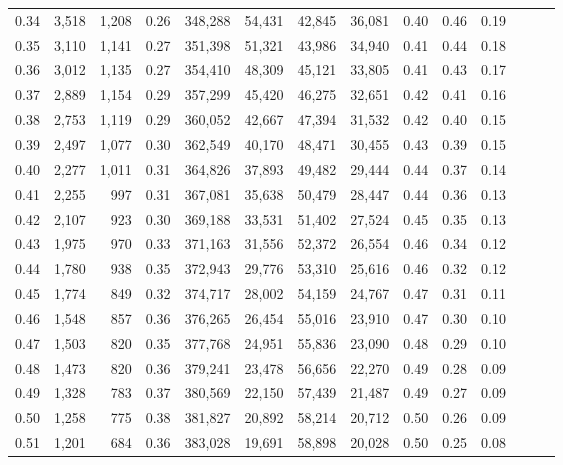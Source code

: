 \begin{tabular}{rrrrrrrrrrrrrr}
0.34 &   3,518 &  1,208 &  0.26 &  348,288 &   54,431 &  42,845 &  36,081 &  0.40 &  0.46 &      0.19 \\
0.35 &   3,110 &  1,141 &  0.27 &  351,398 &   51,321 &  43,986 &  34,940 &  0.41 &  0.44 &      0.18 \\
0.36 &   3,012 &  1,135 &  0.27 &  354,410 &   48,309 &  45,121 &  33,805 &  0.41 &  0.43 &      0.17 \\
0.37 &   2,889 &  1,154 &  0.29 &  357,299 &   45,420 &  46,275 &  32,651 &  0.42 &  0.41 &      0.16 \\
0.38 &   2,753 &  1,119 &  0.29 &  360,052 &   42,667 &  47,394 &  31,532 &  0.42 &  0.40 &      0.15 \\
0.39 &   2,497 &  1,077 &  0.30 &  362,549 &   40,170 &  48,471 &  30,455 &  0.43 &  0.39 &      0.15 \\
0.40 &   2,277 &  1,011 &  0.31 &  364,826 &   37,893 &  49,482 &  29,444 &  0.44 &  0.37 &      0.14 \\
0.41 &   2,255 &    997 &  0.31 &  367,081 &   35,638 &  50,479 &  28,447 &  0.44 &  0.36 &      0.13 \\
0.42 &   2,107 &    923 &  0.30 &  369,188 &   33,531 &  51,402 &  27,524 &  0.45 &  0.35 &      0.13 \\
0.43 &   1,975 &    970 &  0.33 &  371,163 &   31,556 &  52,372 &  26,554 &  0.46 &  0.34 &      0.12 \\
0.44 &   1,780 &    938 &  0.35 &  372,943 &   29,776 &  53,310 &  25,616 &  0.46 &  0.32 &      0.12 \\
0.45 &   1,774 &    849 &  0.32 &  374,717 &   28,002 &  54,159 &  24,767 &  0.47 &  0.31 &      0.11 \\
0.46 &   1,548 &    857 &  0.36 &  376,265 &   26,454 &  55,016 &  23,910 &  0.47 &  0.30 &      0.10 \\
0.47 &   1,503 &    820 &  0.35 &  377,768 &   24,951 &  55,836 &  23,090 &  0.48 &  0.29 &      0.10 \\
0.48 &   1,473 &    820 &  0.36 &  379,241 &   23,478 &  56,656 &  22,270 &  0.49 &  0.28 &      0.09 \\
0.49 &   1,328 &    783 &  0.37 &  380,569 &   22,150 &  57,439 &  21,487 &  0.49 &  0.27 &      0.09 \\
0.50 &   1,258 &    775 &  0.38 &  381,827 &   20,892 &  58,214 &  20,712 &  0.50 &  0.26 &      0.09 \\
0.51 &   1,201 &    684 &  0.36 &  383,028 &   19,691 &  58,898 &  20,028 &  0.50 &  0.25 &      0.08 \\

\end{tabular}
